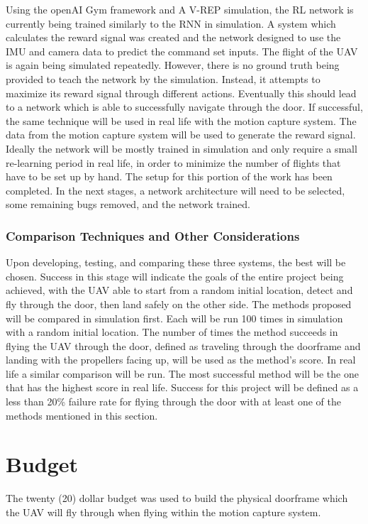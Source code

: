 \documentclass[12pt]{article}
\begin{document}
Using the openAI Gym framework and A V-REP simulation, the RL network is currently being trained similarly to the RNN in simulation. A system which calculates the reward signal was created and the network designed to use the IMU and camera data to predict the command set inputs. The flight of the UAV is again being simulated repeatedly. However, there is no ground truth being provided to teach the network by the simulation. Instead, it attempts to maximize its reward signal through different actions. Eventually this should lead to a network which is able to successfully navigate through the door. If successful, the same technique will be used in real life with the motion capture system. The data from the motion capture system will be used to generate the reward signal. Ideally the network will be mostly trained in simulation and only require a small re-learning period in real life, in order to minimize the number of flights that have to be set up by hand. The setup for this portion of the work has been completed. In the next stages, a network architecture will need to be selected, some remaining bugs removed, and the network trained.

\subsubsection{Comparison Techniques and Other Considerations}
Upon developing, testing, and comparing these three systems, the best will be chosen. Success in this stage will indicate the goals of the entire project being achieved, with the UAV able to start from a random initial location, detect and fly through the door, then land safely on the other side. The methods proposed will be compared in simulation first. Each will be run 100 times in simulation with a random initial location. The number of times the method succeeds in flying the UAV through the door, defined as traveling through the doorframe and landing with the propellers facing up, will be used as the method's score. In real life a similar comparison will be run. The most successful method will be the one that has the highest score in real life. Success for this project will be defined as a less than 20\% failure rate for flying through the door with at least one of the methods mentioned in this section. 



\section{Budget}
The twenty (20) dollar budget was used to build the physical doorframe which the UAV will fly through when flying within the motion capture system. 
\end{document}
